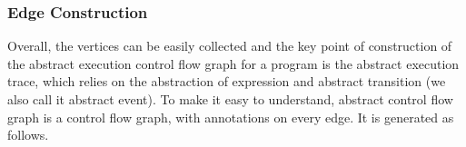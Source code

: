 \subsubsection{Edge Construction}
\label{sec:abscfg-edge}
  Overall, the vertices can be easily collected and the key point of construction of the abstract execution
  control flow graph for a program is the abstract execution trace, 
  which relies on the abstraction of expression and abstract transition (we also call it abstract event).
  To make it easy to understand, abstract control flow graph is a control flow graph, with annotations on every edge.
It is generated as follows.
%
